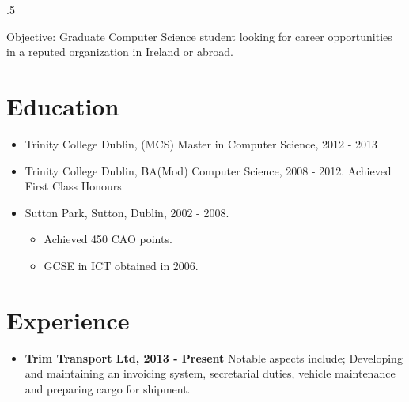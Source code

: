 \documentclass{res}
\begin{document}
 

\thispagestyle{empty} %
\pagestyle{empty}
\address{14 Strand Road\\
Sutton\\
Dublin 13\\
00 353 86 3807768\\
divines@tcd.ie}






\begin{resume}
\vspace{0.1in}
\moveleft.5\sectionwidth\centerline{Objective: Graduate Computer Science student looking for career opportunities in a reputed organization in Ireland or abroad.}  


\section{Education}
\vspace{0.1in} 

  \begin{itemize}
    \item Trinity College Dublin, (MCS) Master in Computer Science, 2012 - 2013
 
    \item Trinity College Dublin, BA(Mod) Computer Science, 2008 - 2012. Achieved First Class Honours
 
    \item Sutton Park, Sutton, Dublin, 2002 - 2008.
      \begin{itemize}
        \item Achieved 450 CAO points.
        \item GCSE in ICT obtained in 2006.
      \end{itemize}
  \end{itemize}
    

\section{Experience} 
\vspace{0.1in}
  \begin{itemize}
    \item{\bf{Trim Transport Ltd, 2013 - Present}} Notable aspects include; Developing and maintaining an invoicing system, secretarial duties, vehicle maintenance and preparing cargo for shipment.\\


\end{itemize}
\end{resume}
\end{document}

